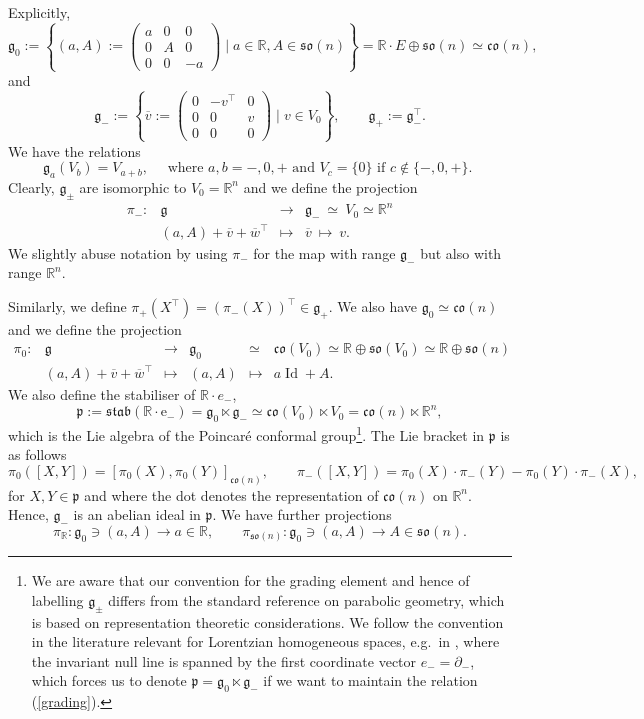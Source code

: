 \documentclass[11pt,a4paper]{amsart}
\DeclareMathOperator{\Id}{Id}
\newcommand{\p}{\mathfrak{p}}
\newcommand{\g}{\mathfrak{g}}
\newcommand{\stab}{\mathfrak{stab}}
\newcommand{\+}{\oplus}
\newcommand{\so}{\mathfrak{so}}
\newcommand{\co}{\mathfrak{co}}
\newcommand{\1}{\mathbf{1}}
\newcommand{\e}{\mathrm{e}}
\newcommand{\R}{\mathbb{R}} %
\newcommand{\<}{\langle}
\renewcommand{\>}{\rangle}
\theoremstyle{definition}
\theoremstyle{plain}
\numberwithin{equation}{section}
\begin{document}
Explicitly,
\[
\g_0:=
\left\{(a,A):=
\begin{pmatrix}
a&0&0 \\0 &A& 0\\0&0&-a
\end{pmatrix}\mid a\in \R, A\in \so(n)\right\}= \R\cdot E\+\so(n)\simeq\co(n),\]
and
\[
\g_-:=
\left\{\overline{v}:=
\begin{pmatrix}
0&-v^\top&0 \\0 &0& v\\0&0&0
\end{pmatrix}\mid v\in V_0\right\},\qquad \g_+:=\g_-^\top.\]
We have the relations
\begin{equation}
\label{grading}\g_a(V_b) = V_{a+b},\quad\text{ 
where $a,b=-,0,+$ and $V_c=\{0\}$ if $c\not\in\{-,0,+\}$. }\end{equation}
Clearly, $\g_\pm$ are isomorphic to $V_0=\R^n$ and we define the projection
\[\begin{array}{crcl}
\pi_- : &\g &\longrightarrow & \g_-\ \simeq \ V_0\simeq \R^n
\\
&(a,A) +\overline{v} +\overline{w}^\top&\mapsto& \overline{v} \ \mapsto \ v.\end{array}\]
We slightly abuse notation by using $\pi_-$ for the map with range $\g_-$ but also with range $\R^n$. 

Similarly, we define $\pi_+( X^\top )= (\pi_- (X))^\top\in \g_+$. 
We also have $\g_0\simeq \co(n)$ and we define the projection
\[\begin{array}{crcccl}
\pi_0 : &\g &\longrightarrow & \g_0 &\simeq & \co(V_0)\simeq \R\+\so(V_0)\simeq \R\+\so(n)
\\
&(a,A) +\overline{v}+\overline{w}^\top&\longmapsto& (a,A) & \mapsto & a\Id+A.\end{array}\]
We also define the stabiliser of $\R\cdot e_-$,
\[\p:=\stab(\R\cdot \e_-)=\g_0\ltimes \g_-\simeq \co(V_0)\ltimes V_0=\co(n)\ltimes \R^n, \]
which is the Lie algebra of the Poincar\'{e} conformal group\footnote{We are aware that our convention for the grading element and hence of labelling $\g_\pm$ differs from the  standard reference \cite{cap-slovak-book1} on parabolic geometry, which is based on representation theoretic considerations.
We follow the convention in the literature relevant for Lorentzian homogeneous spaces, e.g.~in \cite{blau-oloughlin03},
where the invariant null line is spanned by the first coordinate vector $e_-=\partial_-$, which forces us to denote $\p=\g_0\ltimes \g_-$ if we want to maintain the relation (\ref{grading}).}.
The Lie bracket in $\p$ is as follows
\[
\pi_0(
[X,Y])
=
\left[ \pi_0(X),\pi_0(Y)\right]_{\co(n)},\qquad  \pi_-(
[X,Y])= \pi_0(X) \cdot \pi_-(Y) - \pi_0(Y)\cdot  \pi_-(X),
\]
for $X,Y\in \p$ and where the dot denotes the representation of $\co(n)$ on $\R^n$.
Hence, $\g_-$ is an abelian ideal in $\p$. 
We have further projections
\[\pi_\R:\g_0\ni (a,A)\to a\in \R,\qquad \pi_{\so(n)}:\g_0\ni (a,A)\to A\in \so(n).\]
\end{document}
